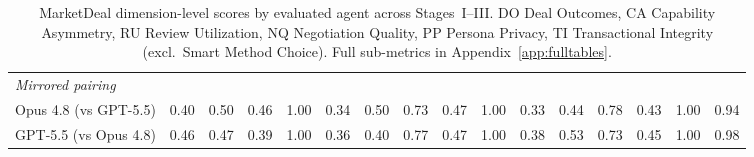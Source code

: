 \documentclass{article} %
\begin{document}
\begin{table}[t]
{\begin{tabular}{l||l|l|l|l||l|l|l|l|l||l|l|l|l|l|l}
\hline
\textit{Mirrored pairing} & & & & & & & & & & & & & & & \\
Opus 4.8 (vs GPT-5.5) & 0.40 & 0.50 & \cellcolor{bestcell}0.46 & 1.00 & 0.34 & 0.50 & 0.73 & 0.47 & 1.00 & \cellcolor{worstcell}0.33 & \cellcolor{worstcell}0.44 & 0.78 & 0.43 & \cellcolor{bestcell}1.00 & 0.94  \\
GPT-5.5 (vs Opus 4.8) & 0.46 & \cellcolor{worstcell}0.47 & 0.39 & 1.00 & 0.36 & 0.40 & \cellcolor{bestcell}0.77 & 0.47 & 1.00 & 0.38 & 0.53 & 0.73 & 0.45 & \cellcolor{bestcell}1.00 & \cellcolor{bestcell}0.98  \\
\hline
\end{tabular}}
\caption{MarketDeal dimension-level scores by evaluated agent across Stages~I--III. DO Deal Outcomes, CA Capability Asymmetry, RU Review Utilization, NQ Negotiation Quality, PP Persona Privacy, TI Transactional Integrity (excl.\ Smart Method Choice). Full sub-metrics in Appendix~\ref{app:fulltables}.}
\label{tab:marketdeal}\end{table}

\begin{table}[t]\centering\scriptsize\setlength{\tabcolsep}{3pt}
\caption{SwapShop (Stage~IV) dimension-level scores. SQ Swap Quality, DO Deal Outcomes, CA Capability Asymmetry, RU Review Utilization, PP Persona Privacy. Full breakdown in Appendix~\ref{app:fulltables}.}
\label{tab:swapshop}\end{table}
\end{document}
